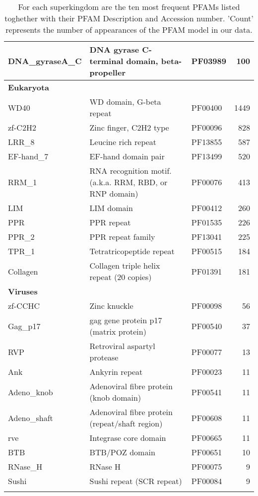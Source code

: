 \documentclass[a4,center,fleqn]{NAR}
\begin{document}
\begin{table*}[t]
\begin{tabular}{lllr}
  DNA\_gyraseA\_C & DNA gyrase C-terminal domain, beta-propeller & PF03989 & 100 \\ 
   \hline
\multicolumn{4}{l}{\textbf{Eukaryota}}\\
WD40 & WD domain, G-beta repeat & PF00400 & 1449 \\ 
  zf-C2H2 & Zinc finger, C2H2 type & PF00096 & 828 \\ 
  LRR\_8 & Leucine rich repeat & PF13855 & 587 \\ 
  EF-hand\_7 & EF-hand domain pair & PF13499 & 520 \\ 
  RRM\_1 & RNA recognition motif. (a.k.a. RRM, RBD, or RNP domain) & PF00076 & 413 \\ 
  LIM & LIM domain & PF00412 & 260 \\ 
  PPR & PPR repeat & PF01535 & 226 \\ 
  PPR\_2 & PPR repeat family & PF13041 & 225 \\ 
  TPR\_1 & Tetratricopeptide repeat & PF00515 & 184 \\ 
  Collagen & Collagen triple helix repeat (20 copies) & PF01391 & 181 \\ 
   \hline
\multicolumn{4}{l}{\textbf{Viruses}}\\
zf-CCHC & Zinc knuckle & PF00098 &  56 \\ 
  Gag\_p17 & gag gene protein p17 (matrix protein) & PF00540 &  37 \\ 
  RVP & Retroviral aspartyl protease & PF00077 &  13 \\ 
  Ank & Ankyrin repeat & PF00023 &  11 \\ 
  Adeno\_knob & Adenoviral fibre protein (knob domain) & PF00541 &  11 \\ 
  Adeno\_shaft & Adenoviral fibre protein (repeat/shaft region) & PF00608 &  11 \\ 
  rve & Integrase core domain & PF00665 &  11 \\ 
  BTB & BTB/POZ domain & PF00651 &  10 \\ 
  RNase\_H & RNase H & PF00075 &   9 \\ 
  Sushi & Sushi repeat (SCR repeat) & PF00084 &   9 \\ 
   \hline
\multicolumn{4}{l}{}\\
\end{tabular}
\caption{For each superkingdom are the ten most frequent PFAMs listed toghether with their PFAM Description and Accession number. 'Count' represents the number of appearances of the PFAM model in our data.}
\label{sup:PFAM_table}
\end{table*}
\end{document}
